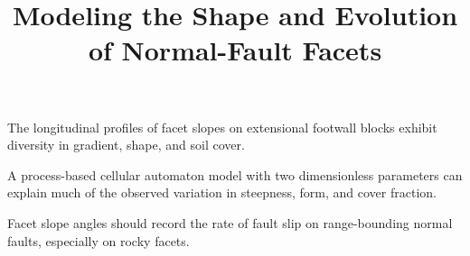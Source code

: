 


%
%


\title{Modeling the Shape and Evolution of Normal-Fault Facets}


%
%

 





\begin{keypoints}
\item The longitudinal profiles of facet slopes on extensional footwall blocks exhibit diversity in gradient, shape, and soil cover.
\item
A process-based cellular automaton model with two dimensionless parameters can explain much of the observed variation in steepness, form, and cover fraction.
\item  Facet slope angles should record the rate of fault slip on range-bounding normal faults, especially on rocky facets.
\end{keypoints}

